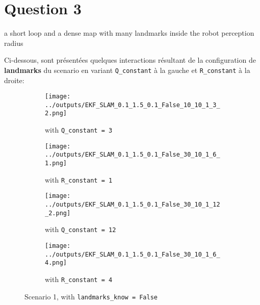 \documentclass[../CSC_5RO12_TA_TP4.tex]{subfiles}
\begin{document}
\section{Question 3}
\begin{definition}
    a short loop and a dense map with many landmarks inside the robot perception radius
\end{definition}
\noindent Ci-dessous, sont présentées quelques interactions résultant de la configuration de \textbf{landmarks} du scenario en variant \texttt{Q\_constant} à la gauche et \texttt{R\_constant} à la droite:
\begin{figure}[H]
    \centering
    \begin{subfigure}[b]{0.475\textwidth}
        \centering
        \texttt{[image: ../outputs/EKF\_SLAM\_0.1\_1.5\_0.1\_False\_10\_10\_1\_3\_2.png]}
        \caption{with \texttt{Q\_constant = 3}}
        \label{}
    \end{subfigure}\hfill
    \begin{subfigure}[b]{0.475\textwidth}
        \centering
        \texttt{[image: ../outputs/EKF\_SLAM\_0.1\_1.5\_0.1\_False\_30\_10\_1\_6\_1.png]}
        \caption{with \texttt{R\_constant = 1}}
        \label{}
    \end{subfigure}\hfill
    \begin{subfigure}[b]{0.475\textwidth}
        \centering
        \texttt{[image: ../outputs/EKF\_SLAM\_0.1\_1.5\_0.1\_False\_30\_10\_1\_12\_2.png]}
        \caption{with \texttt{Q\_constant = 12}}
        \label{}
    \end{subfigure}\hfill
    \begin{subfigure}[b]{0.475\textwidth}
        \centering
        \texttt{[image: ../outputs/EKF\_SLAM\_0.1\_1.5\_0.1\_False\_30\_10\_1\_6\_4.png]}
        \caption{with \texttt{R\_constant = 4}}
        \label{}
    \end{subfigure}
    \caption{Scenario 1, with \texttt{landmarks\_know = False}}
    \label{}
\end{figure}
\end{document}
